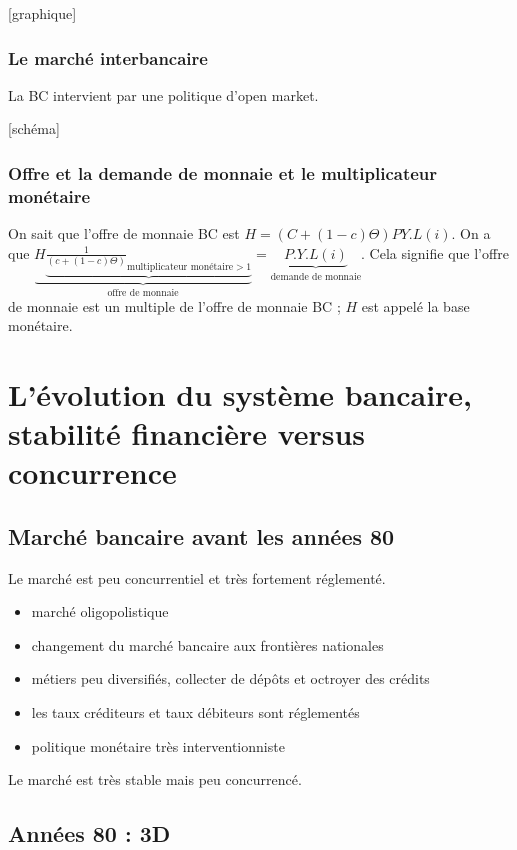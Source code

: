 	[graphique]
	
	\subsubsection{Le marché interbancaire}
	
	La BC intervient par une politique d'open market.
	
	[schéma]
	
	\subsubsection{Offre et la demande de monnaie et le multiplicateur monétaire}
	
	On sait que l'offre de monnaie BC est $H = (C + ( 1 - c) \Theta) P Y . L(i)$. On a que $\underbrace{H \underbrace{\frac{1}{(c + ( 1  - c) \Theta)}_{\text{multiplicateur monétaire} > 1}}}_{\text{offre de monnaie}} = \underbrace{P . Y . L(i)}_{\text{demande de monnaie}}$. Cela signifie que l'offre de monnaie est un multiple de l'offre de monnaie BC ; $H$ est appelé la base monétaire.
	
\section{L'évolution du système bancaire, stabilité financière versus concurrence}
	
	\subsection{Marché bancaire avant les années 80}

	Le marché est peu concurrentiel et très fortement réglementé.
	
	\begin{itemize}
		\item marché oligopolistique
		\item changement du marché bancaire aux frontières nationales
		\item métiers peu diversifiés, collecter de dépôts et octroyer des crédits
		\item les taux créditeurs et taux débiteurs sont réglementés
		\item politique monétaire très interventionniste
	\end{itemize}
	
	Le marché est très stable mais peu concurrencé.
	
	\subsection{Années 80 : 3D}
	
